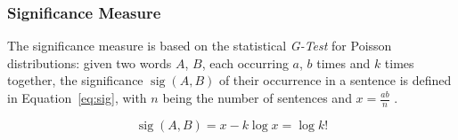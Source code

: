 \subsubsection*{Significance Measure}

The significance measure is based on the statistical \emph{G-Test} for Poisson
distributions: given two words $A$, $B$, each occurring $a$, $b$ times and $k$
times together, the significance $\operatorname{sig}(A, B)$ of their occurrence
in a sentence is defined in Equation~\ref{eq:sig}, with $n$ being the number of
sentences and $x = \frac{ab}{n}$ \cite{biemann2004language}.

\begin{equation}
  \label{eq:sig}
  \operatorname{sig}(A,B) = x - k \log x = \log k!
\end{equation}


